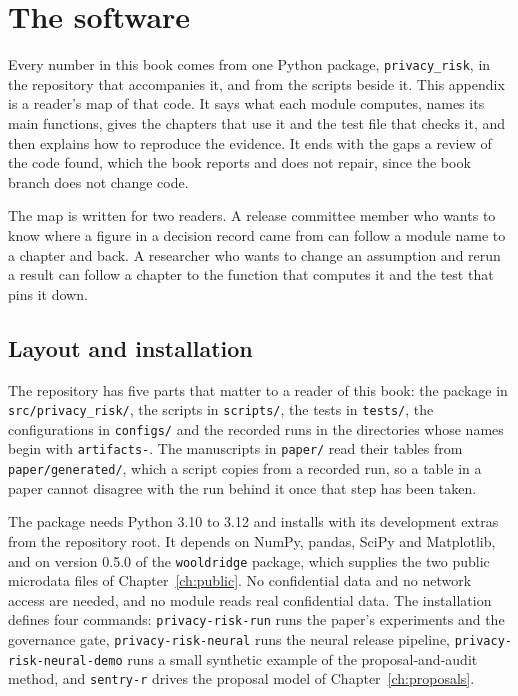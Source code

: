 \chapter{The software}\label{app:software}
\setlength{\emergencystretch}{3em}%

Every number in this book comes from one Python package, \texttt{privacy\_\allowbreak{}risk},
in the repository that accompanies it, and from the scripts beside it. This appendix
is a reader's map of that code. It says what each module computes, names its main
functions, gives the chapters that use it and the test file that checks it, and then
explains how to reproduce the evidence. It ends with the gaps a review of the code
found, which the book reports and does not repair, since the book branch does not
change code.

The map is written for two readers. A release committee member who wants to know
where a figure in a decision record came from can follow a module name to a chapter
and back. A researcher who wants to change an assumption and rerun a result can follow
a chapter to the function that computes it and the test that pins it down.

\section{Layout and installation}

The repository has five parts that matter to a reader of this book: the package in
\texttt{src/\allowbreak{}privacy\_\allowbreak{}risk/\allowbreak{}}, the scripts in \texttt{scripts/\allowbreak{}}, the tests in
\texttt{tests/\allowbreak{}}, the configurations in \texttt{configs/\allowbreak{}} and the recorded runs in the
directories whose names begin with \texttt{artifacts-}. The manuscripts in
\texttt{paper/\allowbreak{}} read their tables from \texttt{paper/\allowbreak{}generated/\allowbreak{}}, which a script copies
from a recorded run, so a table in a paper cannot disagree with the run behind it once
that step has been taken.

The package needs Python 3.10 to 3.12 and installs with its development extras from
the repository root. It depends on NumPy, pandas, SciPy and Matplotlib, and on version
0.5.0 of the \texttt{wooldridge} package, which supplies the two public microdata
files of Chapter~\ref{ch:public}. %
No confidential data and no network access are needed, and no module reads real
confidential data. The installation defines four commands: \texttt{privacy-risk-run}
runs the paper's experiments and the governance gate, \texttt{privacy-risk-neural}
runs the neural release pipeline, \texttt{privacy-risk-neural-demo} runs a small
synthetic example of the proposal-and-audit method, and \texttt{sentry-r} drives the
proposal model of Chapter~\ref{ch:proposals}.

